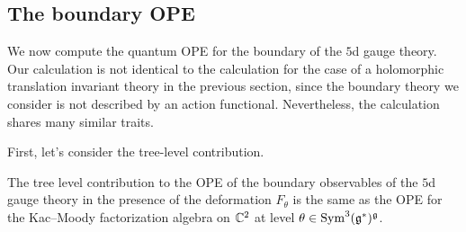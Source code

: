 \documentclass[10pt]{amsart}
\begin{document}
\subsection{The boundary OPE}

We now compute the quantum OPE for the boundary of the $5$d gauge theory.
Our calculation is not identical to the calculation for the case of a holomorphic translation invariant theory in the previous section, since the boundary theory we consider is not described by an action functional. 
Nevertheless, the calculation shares many similar traits. 

First, let's consider the tree-level contribution. 

\begin{prop} The tree level contribution to the OPE of the boundary observables of the $5$d gauge theory in the presence of the deformation $F_\theta$ is the same as the OPE for the Kac--Moody factorization algebra on $\mathbb C^2$ at level $\theta \in {\rm Sym}^3(\mathfrak g^*)^\mathfrak g$. 
\end{prop}
\end{document}
